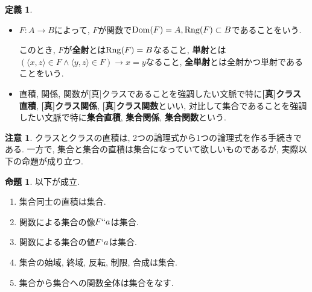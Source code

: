 \documentclass[a4paper, twoside]{bxjsarticle}
\theoremstyle{definition}
\newtheorem{prop}[thm]{命題}
\newtheorem{defn}[thm]{定義}
\newtheorem{rem}[thm]{注意}
\begin{document}
\begin{defn}
\begin{itemize}
                \item $F\colon A\to B$によって, $F$が関数で${\rm Dom}(F)=A, {\rm Rng}(F)\subset B$であることをいう.
                
                このとき, $F$が\textbf{全射}とは${\rm Rng}(F)=B$なること, \textbf{単射}とは$(\langle x, z\rangle \in F \land \langle y, z\rangle \in F) \to x=y$なること, \textbf{全単射}とは全射かつ単射であることをいう.
                
                \item 直積, 関係, 関数が[真]クラスであることを強調したい文脈で特に\textbf{[真]クラス直積}, \textbf{[真]クラス関係}, \textbf{[真]クラス関数}といい, 対比して集合であることを強調したい文脈で特に\textbf{集合直積}, \textbf{集合関係}, \textbf{集合関数}という.
            \end{itemize}
        \end{defn}
        \begin{rem}
            クラスとクラスの直積は, 2つの論理式から1つの論理式を作る手続きである. 一方で, 集合と集合の直積は集合になっていて欲しいものであるが, 実際以下の命題が成り立つ.
        \end{rem}
        \begin{prop}
            以下が成立.
            \begin{enumerate}
                \item 集合同士の直積は集合.
                \item 関数による集合の像$F``a$は集合.
                \item 関数による集合の値$F`a$は集合.
                \item 集合の始域, 終域, 反転, 制限, 合成は集合.
                \item 集合から集合への関数全体は集合をなす.
            \end{enumerate}
        \end{prop}
\end{document}
